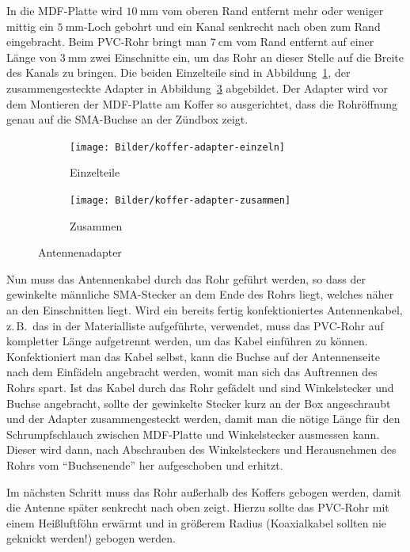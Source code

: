 \documentclass[paper=a4, parskip, numbers=noenddot, toc=listof, headsepline]{scrbook}
\begin{document}
					In die MDF-Platte wird $\SI{10}{\milli\metre}$ vom oberen Rand entfernt mehr oder weniger mittig ein $\SI{5}{\milli\metre}$-Loch gebohrt und ein Kanal senkrecht nach oben zum Rand eingebracht. Beim PVC-Rohr bringt man $\SI{7}{\centi\metre}$ vom Rand entfernt auf einer Länge von $\SI{3}{\milli\metre}$ zwei Einschnitte ein, um das Rohr an dieser Stelle auf die Breite des Kanals zu bringen. Die beiden Einzelteile sind in Abbildung~\ref{fig:koffer-adapter-einzeln}, der zusammengesteckte Adapter in Abbildung~\ref{fig:koffer-adapter-zusammen} abgebildet. Der Adapter wird vor dem Montieren der MDF-Platte am Koffer so ausgerichtet, dass die Rohröffnung genau auf die SMA-Buchse an der Zündbox zeigt.

					\begin{figure}
						\begin{subfigure}[t]{0.5\textwidth}
							\texttt{[image: Bilder/koffer-adapter-einzeln]}
							\caption{Einzelteile}
							\label{fig:koffer-adapter-einzeln}
						\end{subfigure}
						\hfill%
						\begin{subfigure}[t]{0.5\textwidth}
							\texttt{[image: Bilder/koffer-adapter-zusammen]}
							\caption{Zusammen}
							\label{fig:koffer-adapter-zusammen}
						\end{subfigure}
						\caption{Antennenadapter}
					\end{figure}

					Nun muss das Antennenkabel durch das Rohr geführt werden, so dass der gewinkelte männliche SMA-Stecker an dem Ende des Rohrs liegt, welches näher an den Einschnitten liegt. Wird ein bereits fertig konfektioniertes Antennenkabel, z.\,B.\, das in der Materialliste aufgeführte, verwendet, muss das PVC-Rohr auf kompletter Länge aufgetrennt werden, um das Kabel einführen zu können. Konfektioniert man das Kabel selbst, kann die Buchse auf der Antennenseite nach dem Einfädeln angebracht werden, womit man sich das Auftrennen des Rohrs spart. Ist das Kabel durch das Rohr gefädelt und sind Winkelstecker und Buchse angebracht, sollte der gewinkelte Stecker kurz an der Box angeschraubt und der Adapter zusammengesteckt werden, damit man die nötige Länge für den Schrumpfschlauch zwischen MDF-Platte und Winkelstecker ausmessen kann. Dieser wird dann, nach Abschrauben des Winkelsteckers und Herausnehmen des Rohrs vom \enquote{Buchsenende} her aufgeschoben und erhitzt.

					Im nächsten Schritt muss das Rohr außerhalb des Koffers gebogen werden, damit die Antenne später senkrecht nach oben zeigt. Hierzu sollte das PVC-Rohr mit einem Heißluftföhn erwärmt und in größerem Radius (Koaxialkabel sollten nie geknickt werden!) gebogen werden.
\end{document}
